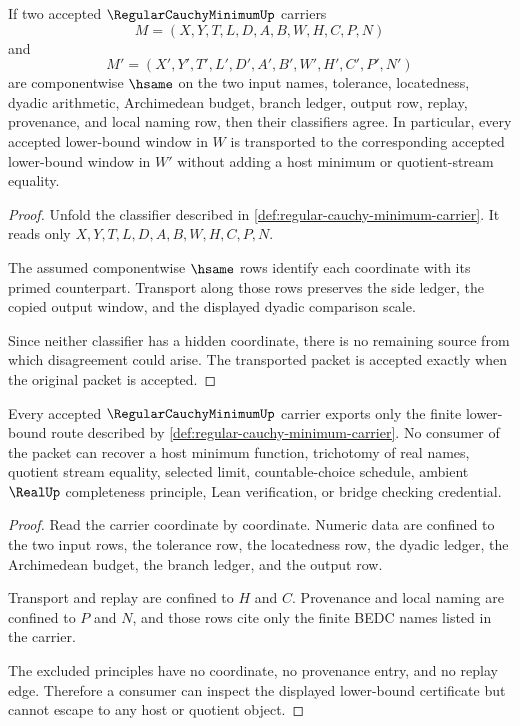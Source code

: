 \begin{theorem}\label{thm:regular-cauchy-minimum-classifier-stability}
If two accepted $\RegularCauchyMinimumUp$ carriers
$$
M=(X,Y,T,L,D,A,B,W,H,C,P,N)
$$
and
$$
M'=(X',Y',T',L',D',A',B',W',H',C',P',N')
$$
are componentwise $\hsame$ on the two input names, tolerance, locatedness, dyadic arithmetic, Archimedean budget, branch ledger, output row, replay, provenance, and local naming row, then their classifiers agree. In particular, every accepted lower-bound window in $W$ is transported to the corresponding accepted lower-bound window in $W'$ without adding a host minimum or quotient-stream equality.
\end{theorem}
\begin{proof}
Unfold the classifier described in \autoref{def:regular-cauchy-minimum-carrier}. It reads only $X,Y,T,L,D,A,B,W,H,C,P,N$.

The assumed componentwise $\hsame$ rows identify each coordinate with its primed counterpart. Transport along those rows preserves the side ledger, the copied output window, and the displayed dyadic comparison scale.

Since neither classifier has a hidden coordinate, there is no remaining source from which disagreement could arise. The transported packet is accepted exactly when the original packet is accepted.
\end{proof}

\begin{theorem}\label{thm:regular-cauchy-minimum-nonescape}
Every accepted $\RegularCauchyMinimumUp$ carrier exports only the finite lower-bound route described by \autoref{def:regular-cauchy-minimum-carrier}. No consumer of the packet can recover a host minimum function, trichotomy of real names, quotient stream equality, selected limit, countable-choice schedule, ambient $\RealUp$ completeness principle, Lean verification, or bridge checking credential.
\end{theorem}
\begin{proof}
Read the carrier coordinate by coordinate. Numeric data are confined to the two input rows, the tolerance row, the locatedness row, the dyadic ledger, the Archimedean budget, the branch ledger, and the output row.

Transport and replay are confined to $H$ and $C$. Provenance and local naming are confined to $P$ and $N$, and those rows cite only the finite BEDC names listed in the carrier.

The excluded principles have no coordinate, no provenance entry, and no replay edge. Therefore a consumer can inspect the displayed lower-bound certificate but cannot escape to any host or quotient object.
\end{proof}

